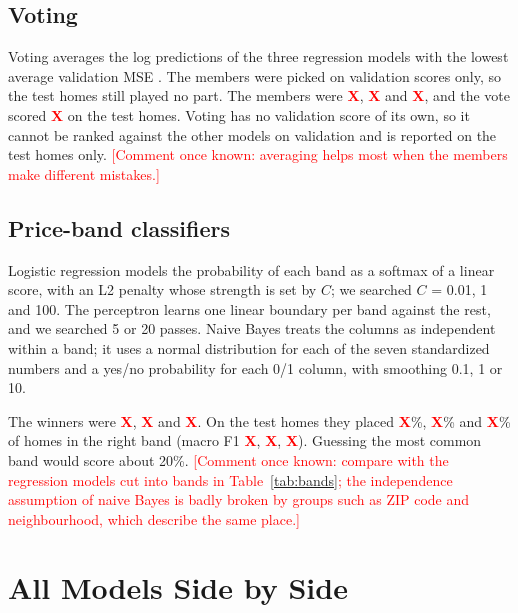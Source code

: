 \documentclass[sigconf,nonacm,10pt]{acmart}
\newcommand{\X}{\textcolor{red}{\textbf{X}}}
\newcommand{\pending}[1]{\textcolor{red}{[#1]}}
\begin{document}
\subsection{Voting}
Voting averages the log predictions of the three regression models with the lowest average validation MSE \cite{dietterich2000}. The members were picked on validation scores only, so the test homes still played no part. The members were \X, \X{} and \X, and the vote scored \X{} on the test homes. Voting has no validation score of its own, so it cannot be ranked against the other models on validation and is reported on the test homes only. \pending{Comment once known: averaging helps most when the members make different mistakes.}

\subsection{Price-band classifiers}
Logistic regression \cite{cox1958} models the probability of each band as a softmax of a linear score, with an L2 penalty whose strength is set by $C$; we searched $C$ = 0.01, 1 and 100. The perceptron \cite{rosenblatt1958} learns one linear boundary per band against the rest, and we searched 5 or 20 passes. Naive Bayes \cite{domingos1997} treats the columns as independent within a band; it uses a normal distribution for each of the seven standardized numbers and a yes/no probability for each 0/1 column, with smoothing 0.1, 1 or 10.

The winners were \X, \X{} and \X. On the test homes they placed \X\%, \X\% and \X\% of homes in the right band (macro F1 \X, \X, \X). Guessing the most common band would score about 20\%. \pending{Comment once known: compare with the regression models cut into bands in Table~\ref{tab:bands}; the independence assumption of naive Bayes is badly broken by groups such as ZIP code and neighbourhood, which describe the same place.}

\section{All Models Side by Side}
\label{sec:all}
\end{document}
